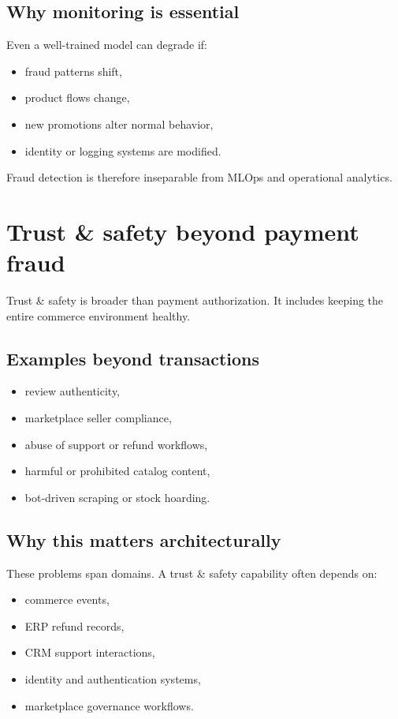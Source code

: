 \subsection{Why monitoring is essential}
Even a well-trained model can degrade if:
\begin{itemize}
  \item fraud patterns shift,
  \item product flows change,
  \item new promotions alter normal behavior,
  \item identity or logging systems are modified.
\end{itemize}

Fraud detection is therefore inseparable from MLOps and operational analytics.

\section{Trust \& safety beyond payment fraud}
Trust \& safety is broader than payment authorization.
It includes keeping the entire commerce environment healthy.

\subsection{Examples beyond transactions}
\begin{itemize}
  \item review authenticity,
  \item marketplace seller compliance,
  \item abuse of support or refund workflows,
  \item harmful or prohibited catalog content,
  \item bot-driven scraping or stock hoarding.
\end{itemize}

\subsection{Why this matters architecturally}
These problems span domains.
A trust \& safety capability often depends on:
\begin{itemize}
  \item commerce events,
  \item ERP refund records,
  \item CRM support interactions,
  \item identity and authentication systems,
  \item marketplace governance workflows.
\end{itemize}

